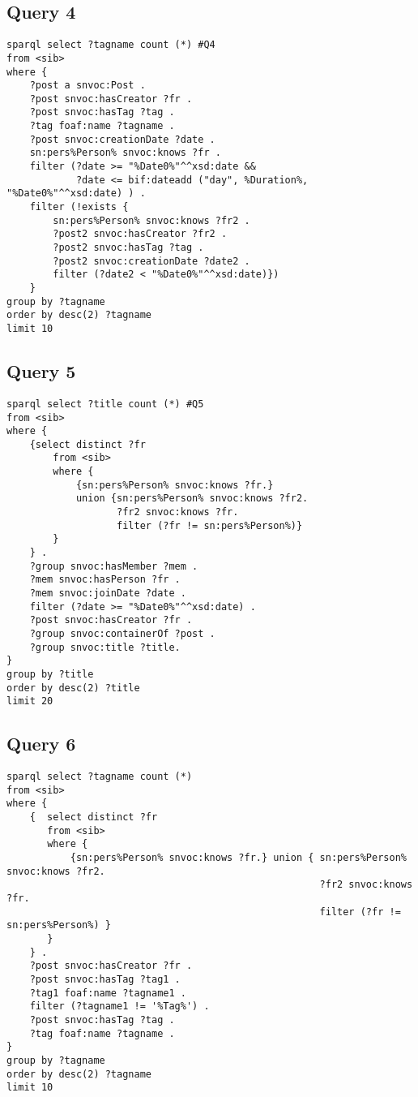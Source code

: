  

\subsection{Query 4}
{\footnotesize
\begin{verbatim}
sparql select ?tagname count (*) #Q4
from <sib>
where {
    ?post a snvoc:Post .
    ?post snvoc:hasCreator ?fr .
    ?post snvoc:hasTag ?tag .
    ?tag foaf:name ?tagname .
    ?post snvoc:creationDate ?date . 
    sn:pers%Person% snvoc:knows ?fr .
    filter (?date >= "%Date0%"^^xsd:date && 
            ?date <= bif:dateadd ("day", %Duration%, "%Date0%"^^xsd:date) ) .
    filter (!exists {
        sn:pers%Person% snvoc:knows ?fr2 .
        ?post2 snvoc:hasCreator ?fr2 .
        ?post2 snvoc:hasTag ?tag .
        ?post2 snvoc:creationDate ?date2 .
        filter (?date2 < "%Date0%"^^xsd:date)}) 
    }
group by ?tagname
order by desc(2) ?tagname
limit 10
\end{verbatim}
}


\subsection{Query 5}
{\footnotesize
\begin{verbatim}
sparql select ?title count (*) #Q5
from <sib>
where {
    {select distinct ?fr
        from <sib>
        where {
            {sn:pers%Person% snvoc:knows ?fr.} 
            union {sn:pers%Person% snvoc:knows ?fr2. 
                   ?fr2 snvoc:knows ?fr. 
                   filter (?fr != sn:pers%Person%)}
        }
    } .
    ?group snvoc:hasMember ?mem .
    ?mem snvoc:hasPerson ?fr .
    ?mem snvoc:joinDate ?date .
    filter (?date >= "%Date0%"^^xsd:date) .
    ?post snvoc:hasCreator ?fr .
    ?group snvoc:containerOf ?post .
    ?group snvoc:title ?title.
}
group by ?title
order by desc(2) ?title
limit 20
\end{verbatim}
}
 

\subsection{Query 6}
{\footnotesize
\begin{verbatim}
sparql select ?tagname count (*) 
from <sib>
where {  
    {  select distinct ?fr
       from <sib>
       where {
           {sn:pers%Person% snvoc:knows ?fr.} union { sn:pers%Person% snvoc:knows ?fr2.
                                                      ?fr2 snvoc:knows ?fr.
                                                      filter (?fr != sn:pers%Person%) }
       }
    } .
    ?post snvoc:hasCreator ?fr .
    ?post snvoc:hasTag ?tag1 .
    ?tag1 foaf:name ?tagname1 .
    filter (?tagname1 != '%Tag%') .
    ?post snvoc:hasTag ?tag .
    ?tag foaf:name ?tagname .
}
group by ?tagname
order by desc(2) ?tagname
limit 10
\end{verbatim}
}




